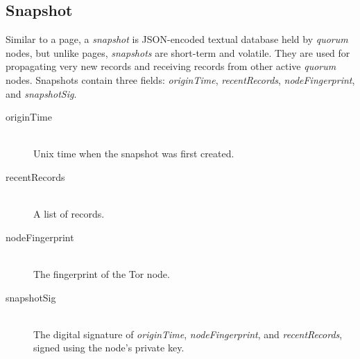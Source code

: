 %
%			
%			
%			
%			
%			
%			

\subsection{Snapshot}

Similar to a page, a \emph{snapshot} is JSON-encoded textual database held by \emph{quorum} nodes, but unlike pages, \emph{snapshots} are short-term and volatile. They are used for propagating very new records and receiving records from other active \emph{quorum} nodes. Snapshots contain three fields: \emph{originTime}, \emph{recentRecords}, \emph{nodeFingerprint}, and \emph{snapshotSig}.

\begin{description}
	\item[originTime] \hfill \\
		Unix time when the snapshot was first created.
	\item[recentRecords] \hfill \\
		A list of records.
	\item[nodeFingerprint] \hfill \\
		The fingerprint of the Tor node.
	\item[snapshotSig] \hfill \\
		The digital signature of \emph{originTime}, \emph{nodeFingerprint}, and \emph{recentRecords}, signed using the node's private key.
\end{description}

